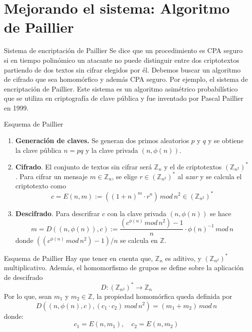 \documentclass{beamer}
\begin{document}
\section{Mejorando el sistema: Algoritmo de Paillier}
\begin{frame}{Sistema de encriptación de Paillier}
Se dice que un procedimiento es CPA seguro si en tiempo polinómico un atacante no puede distinguir entre dos criptotextos partiendo de dos textos sin cifrar elegidos por él. 
\newline
\newline
Debemos buscar un algoritmo de cifrado que sea homomórfico y además CPA seguro. Por ejemplo, el sistema de encriptación de Paillier. 
\newline
\newline
Este sistema es un algoritmo asimétrico probabilístico que se utiliza en criptografía de clave pública y fue inventado por Pascal Paillier en 1999.
\end{frame}

\begin{frame}{Esquema de Paillier}
\begin{enumerate}
    \item \textbf{Generación de claves.} Se generan dos primos aleatorios $p$ y $q$ y se obtiene la clave pública $n=pq$ y la clave privada $(n, \phi(n))$.
    \item \textbf{Cifrado}. El conjunto de textos sin cifrar será $\mathbb{Z}_n$ y el de criptotextos $(\mathbb{Z}_{n^2})^*$. Para cifrar un mensaje $m \in \mathbb{Z}_n$, se elige $r \in (\mathbb{Z}_{n^2})^*$ al \textit{azar} y se calcula el criptotexto como 
$$c = E(n, m) := ((1+n)^m \cdot r^n)\, mod \, n^2 \in (\mathbb{Z}_{n^2})^* $$
    \item \textbf{Descifrado}. Para descrifrar $c$ con la clave privada $(n, \phi(n))$ se hace $$m = D((n, \phi(n)), c) := \dfrac{(c^{\phi(n)}\, mod\, n^2)-1}{n} \cdot \phi(n)^{-1} \, mod \, n $$ donde $((c^{\phi(n)}\, mod\, n^2)-1)/n$ se calcula en $\mathbb{Z}$.
\end{enumerate}    
\end{frame}

\begin{frame}{Esquema de Paillier}
Hay que tener en cuenta que, $\mathbb{Z}_n$ es aditivo, y $(\mathbb{Z}_{n^2})^*$ multiplicativo. Además, el homomorfismo de grupos se define sobre la aplicación de descifrado
$$D: (\mathbb{Z}_{n^2})^* \rightarrow \mathbb{Z}_{n}$$ 
Por lo que, sean $m_1$ y $m_2 \in \mathbb{Z}$, la propiedad homomórfica queda definida por 
$$D((n, \phi(n), c), (c_1 \cdot c_2)\, mod \, n^2) = (m_1 + m_2) \, mod \, n $$
donde: 
$$c_1 = E(n, m_1), \quad c_2 = E(n, m_2)$$
\end{frame}
\end{document}
